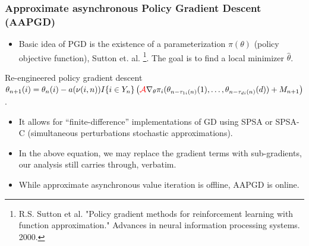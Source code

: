 \documentclass{beamer}
\begin{document}
\begin{frame}
 \frametitle{Approximate asynchronous Policy Gradient Descent (AAPGD)}
 \begin{itemize}
  \item Basic idea of PGD is the existence of a parameterization $\pi(\theta)$ 
  {\color{purple}(policy objective function)}, Sutton et. al. \footnote{
  {\footnotesize \color{purple} R.S. Sutton et al. "Policy gradient methods for reinforcement learning with function approximation." 
 Advances in neural information processing systems. 2000.}
  }. 
  The goal is to find
  a local minimizer $\hat{\theta}$.
  \end{itemize}
  \begin{block}{Re-engineered policy gradient descent}{\footnotesize
   $\theta_{n+1}(i) = \theta_n (i)  - a(\nu(i,n)) I\{ i \in Y_n\} \left(
    {\color{red}\mathcal{A}}\nabla_\theta \pi_i(\theta_{n - \tau_{1i}(n)}(1), \ldots, 
\theta_{n - \tau_{di}(n)}(d)) + M_{n+1} \right)
    $.}
  \end{block}
  \begin{itemize}
   \item It allows for ``finite-difference'' implementations of GD using SPSA or SPSA-C
   (simultaneous perturbations stochastic approximations).
   \item In the above equation, we may replace the {\color{purple}gradient terms} with {\color{purple} sub-gradients}, 
   our analysis still carries through, verbatim.
    \item {\color{purple}While approximate asynchronous value iteration is offline, AAPGD is online}.
  \end{itemize}
\end{frame}
\end{document}
